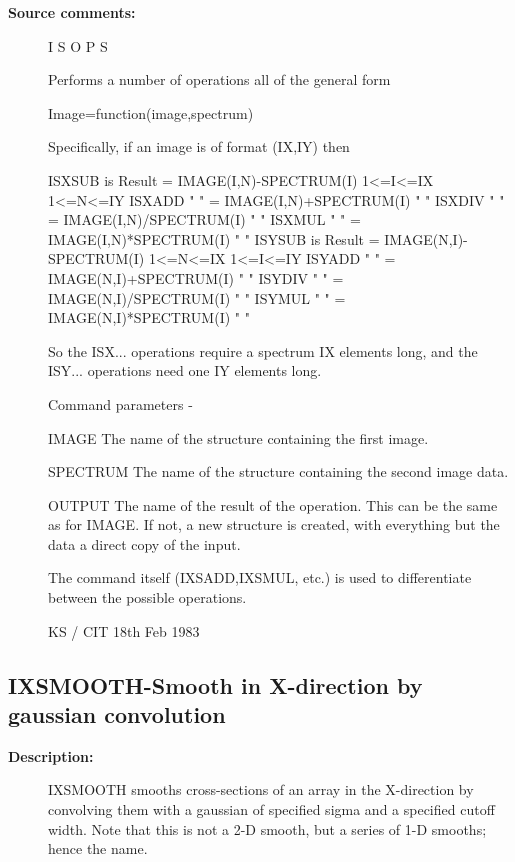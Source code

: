 \begin{description}
\begin{description}
\item [\textbf{Source comments:}]
\begin{terminalv}
 I S O P S

 Performs a number of operations all of the general form

 Image=function(image,spectrum)

 Specifically, if an image is of format (IX,IY) then

 ISXSUB is Result = IMAGE(I,N)-SPECTRUM(I) 1<=I<=IX 1<=N<=IY
 ISXADD  "   "    = IMAGE(I,N)+SPECTRUM(I)    "        "
 ISXDIV  "   "    = IMAGE(I,N)/SPECTRUM(I)    "        "
 ISXMUL  "   "    = IMAGE(I,N)*SPECTRUM(I)    "        "
 ISYSUB is Result = IMAGE(N,I)-SPECTRUM(I) 1<=N<=IX 1<=I<=IY
 ISYADD  "   "    = IMAGE(N,I)+SPECTRUM(I)    "        "
 ISYDIV  "   "    = IMAGE(N,I)/SPECTRUM(I)    "        "
 ISYMUL  "   "    = IMAGE(N,I)*SPECTRUM(I)    "        "

 So the ISX... operations require a spectrum IX elements long,
 and the ISY... operations need one IY elements long.

 Command parameters -

 IMAGE    The name of the structure containing the first image.

 SPECTRUM The name of the structure containing the second
          image data.

 OUTPUT   The name of the result of the operation.  This can
          be the same as for IMAGE.  If not, a new structure
          is created, with everything but the data a direct
          copy of the input.

 The command itself (IXSADD,IXSMUL, etc.) is used to
 differentiate between the possible operations.

                                  KS / CIT 18th Feb 1983
\end{terminalv}
\end{description}
\subsection{IXSMOOTH-\label{IXSMOOTH}Smooth in X-direction by gaussian convolution}
\begin{description}

\item [\textbf{Description:}]
 IXSMOOTH smooths cross-sections of an array in the X-direction
 by convolving them with a gaussian of specified sigma and a
 specified cutoff width.  Note that this is not a 2-D smooth,
 but a series of 1-D smooths; hence the name.


\end{description}
\end{description}
